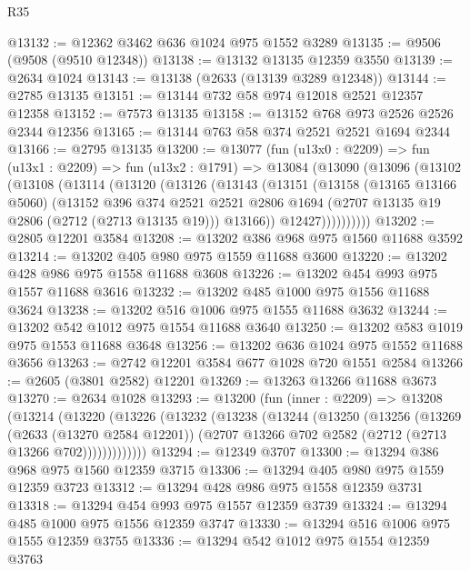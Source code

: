 \begin{lexlean}{R35}
\begin{coremodule}
@13132 := @12362 @3462 @636 @1024 @975 @1552 @3289
@13135 := @9506 (@9508 (@9510 @12348))
@13138 := @13132 @13135 @12359 @3550
@13139 := @2634 @1024
@13143 := @13138 (@2633 (@13139 @3289 @12348))
@13144 := @2785 @13135
@13151 := @13144 @732 @58 @974 @12018 @2521 @12357 @12358
@13152 := @7573 @13135
@13158 := @13152 @768 @973 @2526 @2526 @2344 @12356
@13165 := @13144 @763 @58 @374 @2521 @2521 @1694 @2344
@13166 := @2795 @13135
@13200 := @13077
    (fun (u13x0 : @2209) =>
    fun (u13x1 : @2209) =>
    fun (u13x2 : @1791) =>
    @13084
      (@13090
        (@13096
          (@13102
            (@13108
              (@13114
                (@13120
                  (@13126
                    (@13143
                      (@13151
                        (@13158
                          (@13165 @13166 @5060)
                          (@13152
                            @396
                            @374
                            @2521
                            @2521
                            @2806
                            @1694
                            (@2707 @13135 @19 @2806 (@2712 (@2713 @13135 @19)))
                            @13166))
                        @12427))))))))))
@13202 := @2805 @12201 @3584
@13208 := @13202 @386 @968 @975 @1560 @11688 @3592
@13214 := @13202 @405 @980 @975 @1559 @11688 @3600
@13220 := @13202 @428 @986 @975 @1558 @11688 @3608
@13226 := @13202 @454 @993 @975 @1557 @11688 @3616
@13232 := @13202 @485 @1000 @975 @1556 @11688 @3624
@13238 := @13202 @516 @1006 @975 @1555 @11688 @3632
@13244 := @13202 @542 @1012 @975 @1554 @11688 @3640
@13250 := @13202 @583 @1019 @975 @1553 @11688 @3648
@13256 := @13202 @636 @1024 @975 @1552 @11688 @3656
@13263 := @2742 @12201 @3584 @677 @1028 @720 @1551 @2584
@13266 := @2605 (@3801 @2582) @12201
@13269 := @13263 @13266 @11688 @3673
@13270 := @2634 @1028
@13293 := @13200
    (fun (inner : @2209) =>
    @13208
      (@13214
        (@13220
          (@13226
            (@13232
              (@13238
                (@13244
                  (@13250
                    (@13256
                      (@13269
                        (@2633 (@13270 @2584 @12201))
                        (@2707 @13266 @702 @2582 (@2712 (@2713 @13266 @702)))))))))))))
@13294 := @12349 @3707
@13300 := @13294 @386 @968 @975 @1560 @12359 @3715
@13306 := @13294 @405 @980 @975 @1559 @12359 @3723
@13312 := @13294 @428 @986 @975 @1558 @12359 @3731
@13318 := @13294 @454 @993 @975 @1557 @12359 @3739
@13324 := @13294 @485 @1000 @975 @1556 @12359 @3747
@13330 := @13294 @516 @1006 @975 @1555 @12359 @3755
@13336 := @13294 @542 @1012 @975 @1554 @12359 @3763

\end{coremodule}
\end{lexlean}
